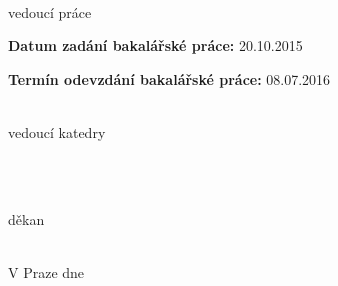 \documentclass[a4paper,11pt,twoside,final]{article}
\begin{document}
\begin{titlepage}
\begin{minipage}{0.3\textwidth}
\begin{center}

\dotfill\\
    vedoucí práce
\end{center}
\end{minipage}

\vfill
\textbf{Datum zadání bakalářské práce:} 20.10.2015 %

\textbf{Termín odevzdání bakalářské práce:} 08.07.2016 \\[4cm] %


\begin{minipage}{0.3\textwidth}
  \begin{center}\dotfill\\
      vedoucí katedry
  \end{center}
\end{minipage}
~\hfill
\begin{minipage}{0.3\textwidth}
  \begin{center}
  \dotfill\\
  děkan
  \end{center}
\end{minipage}
\\[2cm]

V Praze dne
\end{titlepage}
\end{document}
